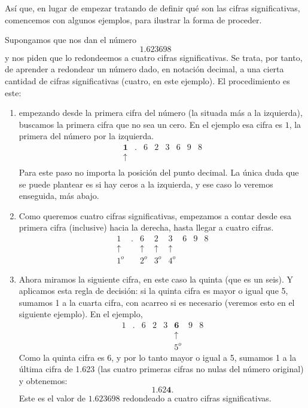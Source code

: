 Así que, en lugar de empezar tratando de definir qué son las cifras significativas, comencemos con algunos ejemplos, para ilustrar la forma de proceder.

\begin{Ejemplo}
Supongamos que nos dan el número
\[1.623698\]
y nos piden que lo redondeemos a cuatro cifras significativas. Se trata, por tanto, de aprender a redondear un número dado, en notación decimal, a una cierta cantidad de cifras significativas (cuatro, en este ejemplo). El procedimiento es
este:
\begin{enumerate}
  \item empezando desde la primera cifra del número (la situada más a la izquierda), buscamos la primera cifra que no sea un cero. En el ejemplo esa cifra es $1$, la primera del número por la izquierda.
  \[
    \begin{array}{cccccccc}
      \mathbf{1}&.&6&2&3&6&9&8\\
      \mathbf{\uparrow}\\
    \end{array}
  \]
  Para este paso no importa la posición del punto decimal. La única duda que se puede plantear es si hay ceros a la izquierda, y ese caso lo veremos enseguida, más abajo.
  \item Como queremos cuatro cifras significativas, empezamos a contar desde esa primera cifra (inclusive) hacia la derecha, hasta llegar a  cuatro cifras.
  \[
    \begin{array}{cccccccc}
      1&.&6&2&3&6&9&8\\
      \mathbf{\uparrow}&&\mathbf{\uparrow}&\mathbf{\uparrow}&\mathbf{\uparrow}\\
      1^o&&2^o&3^o&4^o
    \end{array}
  \]
  \item Ahora miramos la siguiente cifra, en este caso la quinta (que es un seis). Y aplicamos esta regla de decisión: si la quinta cifra es mayor o igual que 5, sumamos 1 a la cuarta cifra, con acarreo si es necesario (veremos esto en el siguiente ejemplo). En el ejemplo,
  \[
    \begin{array}{cccccccc}
      1&.&6&2&3&\mathbf{6}&9&8\\
      &&&&&\mathbf{\uparrow}\\
      &&&&&5^o
    \end{array}
  \]
  Como la quinta cifra es 6, y por lo tanto mayor o igual a 5,  sumamos 1 a la última cifra de 1.623 (las cuatro primeras cifras no nulas del número original) y obtenemos:
  \[1.62\mathbf{4}.\]
  Este es el valor de $1.623698$ redondeado a cuatro cifras significativas.
  \end{enumerate}


\end{Ejemplo}

